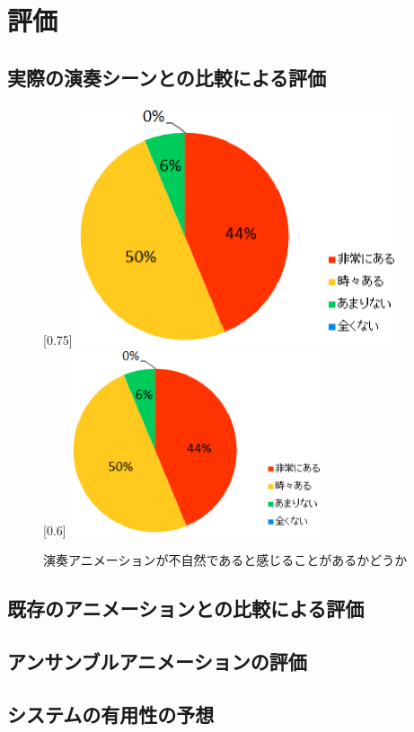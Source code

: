 \section{評価} \label{sec:review}

\subsection{実際の演奏シーンとの比較による評価}

\begin{figure}[t]
	\centering
	[0.75\linewidth]{
		\includegraphics[height=7cm]{fig/chap1/Q1-1.eps}}
	[0.6\linewidth]{
		\includegraphics[height=5.5cm]{fig/chap1/Q1-2.eps}}
	\caption{演奏アニメーションが不自然であると感じることがあるかどうか}
	\label{fig:model}
\end{figure}

\subsection{既存のアニメーションとの比較による評価}

\subsection{アンサンブルアニメーションの評価}

\subsection{システムの有用性の予想}